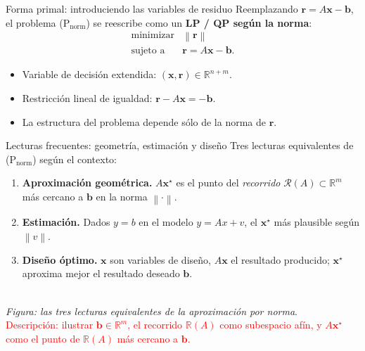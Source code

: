 \documentclass[10pt,aspectratio=169]{beamer}
\newcommand{\R}{\mathbb{R}}
\newcommand{\x}{\mathbf{x}}
\newcommand{\xb}{\mathbf{b}}
\newcommand{\bx}{\mathbf{b}}
\newcommand{\0}{\mathbf{0}}
\newcommand{\1}{\mathbf{1}}
\newcommand{\res}{\mathbf{r}}
\newcommand{\norm}[1]{\left\|#1\right\|}
\begin{document}
\begin{frame}{Forma primal: introduciendo las variables de residuo}
  Reemplazando $\res = A\x - \xb$, el problema (P$_{\text{norm}}$) se
  reescribe como un \textbf{LP / QP según la norma}:
  \[
    \begin{array}{ll}
      \text{minimizar} & \norm{\res} \\
      \text{sujeto a}  & \res = A\x - \xb.
    \end{array}
  \]
  \begin{itemize}
    \item Variable de decisión extendida: $(\x,\res)\in\R^{n+m}$.
    \item Restricción lineal de igualdad: $\res - A\x = -\xb$.
    \item La estructura del problema depende sólo de la norma de $\res$.
  \end{itemize}
\end{frame}

\begin{frame}{Lecturas frecuentes: geometría, estimación y diseño}
  Tres lecturas equivalentes de (P$_{\text{norm}}$) según el contexto:
  \begin{enumerate}
    \item \textbf{Aproximación geométrica.}\quad
      $A\x^\star$ es el punto del \emph{recorrido} $\mathcal{R}(A)
      \subset \R^m$ más cercano a $\xb$ en la norma $\norm{\cdot}$.
    \item \textbf{Estimación.} \quad
      Dados $y=b$ en el modelo $y=Ax+v$, el $\x^\star$ más plausible
      según $\norm{v}$.
    \item \textbf{Diseño óptimo.} \quad
      $\x$ son variables de diseño, $A\x$ el resultado producido;
      $\x^\star$ aproxima mejor el resultado deseado $\xb$.
  \end{enumerate}

\begin{center}
    \\[2pt]
    {\footnotesize \emph{Figura: las tres lecturas equivalentes de la aproximación por norma}.}\\
    {\footnotesize \textcolor{red}{Descripción: ilustrar $\bx\in\R^m$, el recorrido $\R(A)$ como subespacio afín, y $A\x^\star$ como el punto de $\R(A)$ más cercano a $\bx$.}}
  \end{center}
\end{frame}
\end{document}
